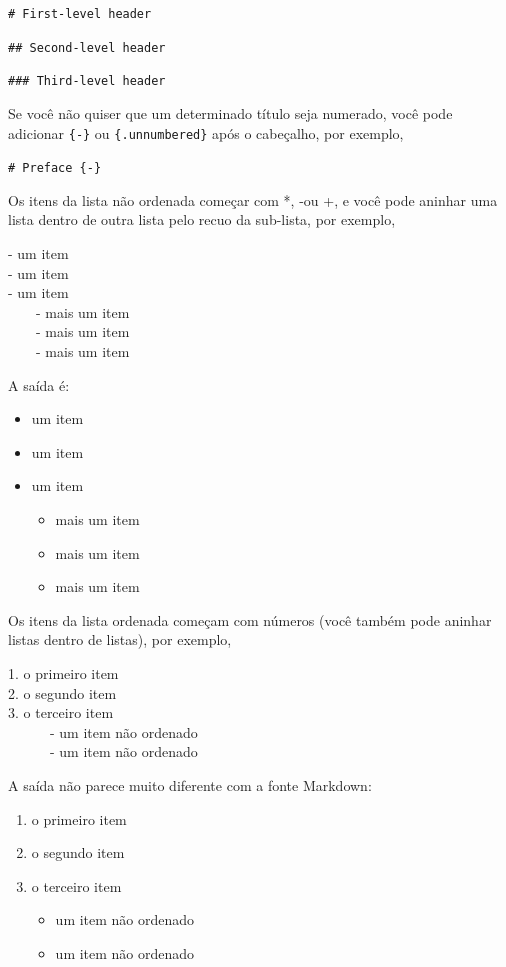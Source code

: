 \documentclass[12pt,a4paper,oneside]{erdc}
\begin{document}
\verb|# First-level header|

\verb|## Second-level header|

\verb|### Third-level header|

Se você não quiser que um determinado título seja numerado, você pode adicionar \verb|{-}| ou \verb|{.unnumbered}| após o cabeçalho, por exemplo,

\verb|# Preface {-}|

Os itens da lista não ordenada começar com *, -ou +, e você pode aninhar uma lista dentro de outra lista pelo recuo da sub-lista, por exemplo,

- um item\\
- um item\\
- um item\\
~~~~- mais um item\\
~~~~- mais um item\\
~~~~- mais um item

A saída é:
\begin{itemize}
	\item um item
	\item um item
	\item um item
	\begin{itemize}
		\item mais um item
		\item mais um item
		\item mais um item
	\end{itemize}
\end{itemize}

Os itens da lista ordenada começam com números (você também pode aninhar listas dentro de listas), por exemplo,

1. o primeiro item\\
2. o segundo item\\
3. o terceiro item\\
~~~~~~- um item não ordenado\\
~~~~~~- um item não ordenado


A saída não parece muito diferente com a fonte Markdown:

\begin{enumerate}
	\item o primeiro item
	\item o segundo item
	\item o terceiro item
	\begin{itemize}
		\item um item não ordenado
		\item um item não ordenado
	\end{itemize}
\end{enumerate}
\end{document}
